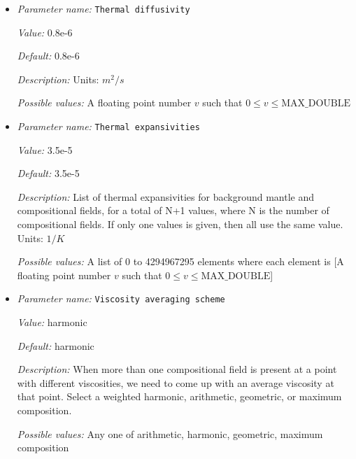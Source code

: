 \begin{itemize}
{\it Default:} 3.5


{\it Description:} List of stress exponents, $n_dislocation$, for background mantle and compositional fields, for a total of N+1 values, where N is the number of compositional fields. If only one values is given, then all use the same value.  Units: None


{\it Possible values:} A list of 0 to 4294967295 elements where each element is [A floating point number $v$ such that $0 \leq v \leq \text{MAX\_DOUBLE}$]
\item {\it Parameter name:} {\tt Thermal diffusivity}
\label{parameters:Material model/Diffusion dislocation/Thermal diffusivity}


{\it Value:} 0.8e-6


{\it Default:} 0.8e-6


{\it Description:} Units: $m^2/s$


{\it Possible values:} A floating point number $v$ such that $0 \leq v \leq \text{MAX\_DOUBLE}$
\item {\it Parameter name:} {\tt Thermal expansivities}
\label{parameters:Material model/Diffusion dislocation/Thermal expansivities}


{\it Value:} 3.5e-5


{\it Default:} 3.5e-5


{\it Description:} List of thermal expansivities for background mantle and compositional fields, for a total of N+1 values, where N is the number of compositional fields. If only one values is given, then all use the same value.  Units: $1 / K$


{\it Possible values:} A list of 0 to 4294967295 elements where each element is [A floating point number $v$ such that $0 \leq v \leq \text{MAX\_DOUBLE}$]
\item {\it Parameter name:} {\tt Viscosity averaging scheme}
\label{parameters:Material model/Diffusion dislocation/Viscosity averaging scheme}


{\it Value:} harmonic


{\it Default:} harmonic


{\it Description:} When more than one compositional field is present at a point with different viscosities, we need to come up with an average viscosity at that point.  Select a weighted harmonic, arithmetic, geometric, or maximum composition.


{\it Possible values:} Any one of arithmetic, harmonic, geometric, maximum composition
\end{itemize}

